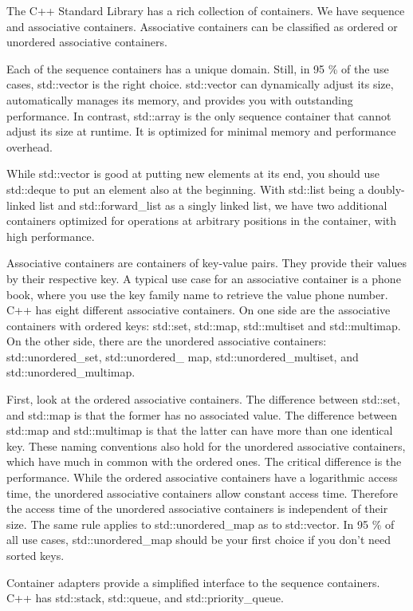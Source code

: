 The C++ Standard Library has a rich collection of containers. We have sequence and associative containers. Associative containers can be classified as ordered or unordered associative containers.

Each of the sequence containers has a unique domain. Still, in 95 \% of the use cases, std::vector is the right choice. std::vector can dynamically adjust its size, automatically manages its memory, and provides you with outstanding performance. In contrast, std::array is the only sequence container that cannot adjust its size at runtime. It is optimized for minimal memory and performance overhead.

While std::vector is good at putting new elements at its end, you should use std::deque to put an element also at the beginning. With std::list being a doubly-linked list and std::forward\_list as a singly linked list, we have two additional containers optimized for operations at arbitrary positions in the container, with high performance.

Associative containers are containers of key-value pairs. They provide their values by their respective key. A typical use case for an associative container is a phone book, where you use the key family name to retrieve the value phone number. C++ has eight different associative containers. On one side are the associative containers with ordered keys: std::set, std::map, std::multiset and std::multimap. On the other side, there are the unordered associative containers: std::unordered\_set, std::unordered\_ map, std::unordered\_multiset, and std::unordered\_multimap.

First, look at the ordered associative containers. The difference between std::set, and std::map is that the former has no associated value. The difference between std::map and std::multimap is that the latter can have more than one identical key. These naming conventions also hold for the unordered associative containers, which have much in common with the ordered ones. The critical difference is the performance. While the ordered associative containers have a logarithmic access time, the unordered associative containers allow constant access time. Therefore the access time of the unordered associative containers is independent of their size. The same rule applies to std::unordered\_map as to std::vector. In 95 \% of all use cases, std::unordered\_map should be your first choice if you don’t need sorted keys.

Container adapters provide a simplified interface to the sequence containers. C++ has std::stack, std::queue, and std::priority\_queue.

